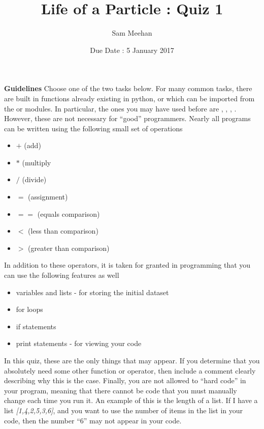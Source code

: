 \documentclass[12pt]{article}
\title{Life of a Particle : Quiz 1}
\author{Sam Meehan}
\date{Due Date : 5 January 2017}
\begin{document}
\maketitle


\textbf{Guidelines} 
\newline
Choose one of the two tasks below.
\newline
\newline
For many common tasks, there are built in functions already existing in python, or which can be imported from the \small{} or \small{} modules.  In particular, the ones you may have used before are \small{}, \small{}, \small{}, \small{}.  However, these are not necessary for ``good'' programmers.  Nearly all programs can be written using the following small set of operations 
\begin{itemize}[noitemsep]
\item $+$ (add)
\item $*$ (multiply
\item $/$ (divide)
\item $=$ (assignment)
\item $==$ (equals comparison)
\item $<$ (less than comparison)
\item $>$ (greater than comparison)
\end{itemize}
In addition to these operators, it is taken for granted in programming that you can use the following features as well
\begin{itemize}[noitemsep]
\item variables and lists - for storing the initial dataset
\item for loops
\item if statements
\item print statements - for viewing your code
\end{itemize}
In this quiz, these are the only things that may appear.   If you determine that you absolutely need some other function or operator, then include a comment clearly describing why this is the case.
\newline
Finally, you are not allowed to ``hard code'' in your program, meaning that there cannot be code that you must manually change each time you run it.  An example of this is the length of a list.  If I have a list \textit{[1,4,2,5,3,6]}, and you want to use the number of items in the list in your code, then the number ``6'' may not appear in your code.  
\end{document}
